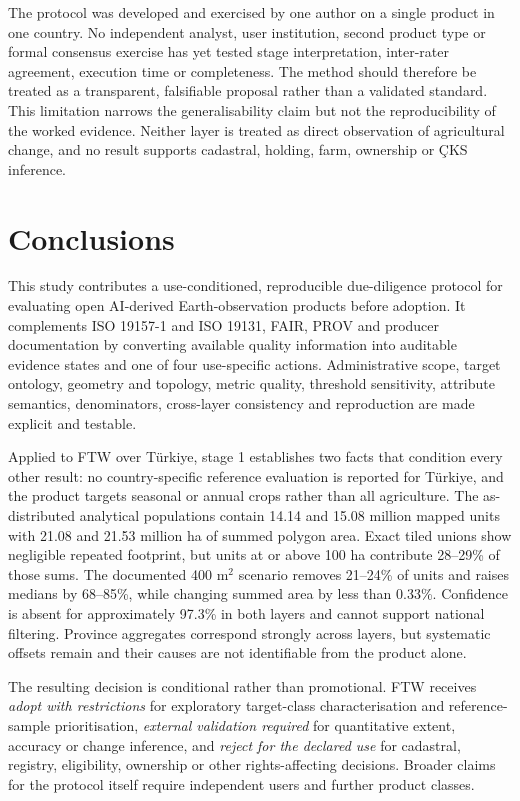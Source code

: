 \documentclass[pdflatex,sn-basic]{sn-jnl}
\begin{document}
The protocol was developed and exercised by one author on a single product in one country. No independent analyst, user institution, second product type or formal consensus exercise has yet tested stage interpretation, inter-rater agreement, execution time or completeness. The method should therefore be treated as a transparent, falsifiable proposal rather than a validated standard. This limitation narrows the generalisability claim but not the reproducibility of the worked evidence. Neither layer is treated as direct observation of agricultural change, and no result supports cadastral, holding, farm, ownership or ÇKS inference.

\section{Conclusions}\label{sec:conclusions}

This study contributes a use-conditioned, reproducible due-diligence protocol for evaluating open AI-derived Earth-observation products before adoption. It complements ISO 19157-1 and ISO 19131, FAIR, PROV and producer documentation by converting available quality information into auditable evidence states and one of four use-specific actions. Administrative scope, target ontology, geometry and topology, metric quality, threshold sensitivity, attribute semantics, denominators, cross-layer consistency and reproduction are made explicit and testable.

Applied to FTW over Türkiye, stage 1 establishes two facts that condition every other result: no country-specific reference evaluation is reported for Türkiye, and the product targets seasonal or annual crops rather than all agriculture. The as-distributed analytical populations contain 14.14 and 15.08 million mapped units with 21.08 and 21.53 million ha of summed polygon area. Exact tiled unions show negligible repeated footprint, but units at or above 100 ha contribute 28--29\% of those sums. The documented 400 m$^{2}$ scenario removes 21--24\% of units and raises medians by 68--85\%, while changing summed area by less than 0.33\%. Confidence is absent for approximately 97.3\% in both layers and cannot support national filtering. Province aggregates correspond strongly across layers, but systematic offsets remain and their causes are not identifiable from the product alone.

The resulting decision is conditional rather than promotional. FTW receives \emph{adopt with restrictions} for exploratory target-class characterisation and reference-sample prioritisation, \emph{external validation required} for quantitative extent, accuracy or change inference, and \emph{reject for the declared use} for cadastral, registry, eligibility, ownership or other rights-affecting decisions. Broader claims for the protocol itself require independent users and further product classes.
\end{document}
